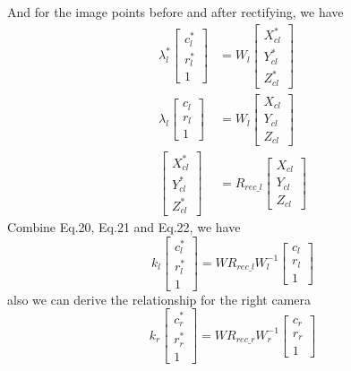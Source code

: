 \documentclass{article}
\begin{document}
And for the image points before and after rectifying, we have
\begin{align}
\lambda_l^*\begin{bmatrix}c_l^*\\r_l^*\\1\end{bmatrix}&=W_l\begin{bmatrix}X_{cl}^*\\Y_{cl}^*\\Z_{cl}^*\end{bmatrix}\\
\lambda_l\begin{bmatrix}c_l\\r_l\\1\end{bmatrix}&=W_l\begin{bmatrix}X_{cl}\\Y_{cl}\\Z_{cl}\end{bmatrix}\\
\begin{bmatrix}X_{cl}^*\\Y_{cl}^*\\Z_{cl}^*\end{bmatrix}&=R_{rec\_l}\begin{bmatrix}X_{cl}\\Y_{cl}\\Z_{cl}\end{bmatrix}
\end{align} 
Combine Eq.20, Eq.21 and Eq.22, we have
\begin{equation}
k_l\begin{bmatrix}c_l^*\\r_l^*\\1\end{bmatrix}=WR_{rec\_l}W_l^{-1}\begin{bmatrix}c_l\\r_l\\1\end{bmatrix}
\end{equation}
also we can derive the relationship for the right camera 
\begin{equation}
k_r\begin{bmatrix}c_r^*\\r_r^*\\1\end{bmatrix}=WR_{rec\_r}W_r^{-1}\begin{bmatrix}c_r\\r_r\\1\end{bmatrix}
\end{equation}
\end{document}
